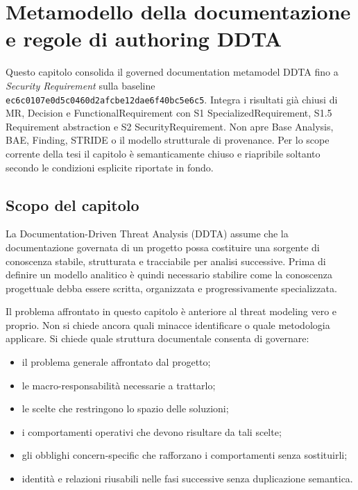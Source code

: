\documentclass[12pt,a4paper,oneside]{report}
\newcommand{\artifact}[1]{\nolinkurl{#1}}
\newcommand{\secreq}{\textit{Security Requirement}}
\begin{document}
\setcounter{chapter}{3}
\chapter{Metamodello della documentazione e regole di authoring DDTA}
\label{chap:documentation-authoring-metamodel}

\begin{epistemicnote}
Questo capitolo consolida il governed documentation metamodel DDTA fino a \secreq{} sulla baseline \artifact{ec6c0107e0d5c0460d2afcbe12dae6f40bc5e6c5}. Integra i risultati già chiusi di MR, Decision e FunctionalRequirement con S1 SpecializedRequirement, S1.5 Requirement abstraction e S2 SecurityRequirement. Non apre Base Analysis, BAE, Finding, STRIDE o il modello strutturale di provenance. Per lo scope corrente della tesi il capitolo è semanticamente chiuso e riapribile soltanto secondo le condizioni esplicite riportate in fondo.
\end{epistemicnote}

\section{Scopo del capitolo}

La Documentation-Driven Threat Analysis (DDTA) assume che la documentazione governata di un progetto possa costituire una sorgente di conoscenza stabile, strutturata e tracciabile per analisi successive. Prima di definire un modello analitico è quindi necessario stabilire come la conoscenza progettuale debba essere scritta, organizzata e progressivamente specializzata.

Il problema affrontato in questo capitolo è anteriore al threat modeling vero e proprio. Non si chiede ancora quali minacce identificare o quale metodologia applicare. Si chiede quale struttura documentale consenta di governare:
\begin{itemize}
  \item il problema generale affrontato dal progetto;
  \item le macro-responsabilità necessarie a trattarlo;
  \item le scelte che restringono lo spazio delle soluzioni;
  \item i comportamenti operativi che devono risultare da tali scelte;
  \item gli obblighi concern-specific che rafforzano i comportamenti senza sostituirli;
  \item identità e relazioni riusabili nelle fasi successive senza duplicazione semantica.
\end{itemize}
\end{document}
